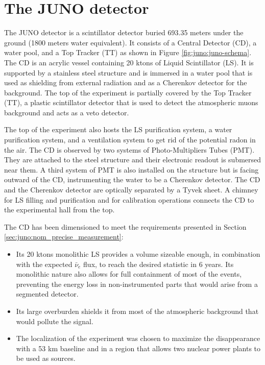 \documentclass[../main.tex]{subfiles}
\begin{document}
\section{The JUNO detector}
\label{sec:juno:juno_detector}

The JUNO detector is a scintillator detector buried 693.35 meters under the ground (1800 meters water equivalent). It consists of a Central Detector (CD), a water pool, and a Top Tracker (TT) as shown in Figure \ref{fig:juno:juno-schema}.
The CD is an acrylic vessel containing 20 ktons of Liquid Scintillator (LS). It is supported by a stainless steel structure and is immersed in a water pool that is used as shielding from external radiation and as a Cherenkov detector for the background. The top of the experiment is partially covered by the Top Tracker (TT), a plastic scintillator detector that is used to detect the atmospheric muons background and acts as a veto detector.


The top of the experiment also hosts the LS purification system, a water purification system, and a ventilation system to get rid of the potential radon in the air.
The CD is observed by two systems of Photo-Multipliers Tubes (PMT). They are attached to the steel structure and their electronic readout is submersed near them. A third system of PMT is also installed on the structure but is facing outward of the CD, instrumenting the water to be a Cherenkov detector. The CD and the Cherenkov detector are optically separated by a Tyvek sheet. A chimney for LS filling and purification and for calibration operations connects the CD to the experimental hall from the top.

The CD has been dimensioned to meet the requirements presented in Section \ref{sec:juno:nom_precise_measurement}:
\begin{itemize}
  \item Its 20 ktons monolithic LS provides a volume sizeable enough, in combination with the expected $\bar{\nu}_e$ flux, to reach the desired statistic in 6 years. Its monolithic nature also allows for full containment of most of the events, preventing the energy loss in non-instrumented parts that would arise from a segmented detector.
  \item Its large overburden shields it from most of the atmospheric background that would pollute the signal.
  \item The localization of the experiment was chosen to maximize the disappearance with a 53 km baseline and in a region that allows two nuclear power plants to be used as sources.
\end{itemize}
\end{document}
